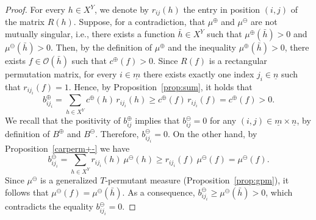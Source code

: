 \documentclass[11pt]{article}
\begin{document}
\begin{proof}
For every $h \in X^{Y}$, we denote by $r_{ij}(h)$ the entry in position $(i,j)$ of the matrix $R(h)$. Suppose, for a contradiction, that $\mu^\oplus$ and $\mu^\ominus$ are not mutually singular, i.e., there exists a function $\bar h \in X^{Y}$ such that $\mu^{\oplus}(\bar h) > 0$ and $\mu^{\ominus}(\bar h) > 0$. Then, by the definition of $\mu^{\oplus}$ and the inequality $\mu^{\oplus}(\bar h) > 0$, there exists $f \in \mathcal{O}(\bar h)$ such that $c^{\oplus}(f) > 0$. Since $R(f)$ is a rectangular permutation matrix, for every $i \in \underline{m}$ there exists exactly one index $j_i \in \underline{n}$ such that $r_{i j_i}(f) = 1$. Hence, by Proposition~\ref{prop:sum}, it holds that
\[
b^{\oplus}_{i j_i}
= \sum_{h \in X^{Y}} c^{\oplus}(h)\, r_{i j_i}(h)
\ge c^{\oplus}(f)\, r_{i j_i}(f)
= c^{\oplus}(f) > 0.
\]
We recall that the positivity of $b^\oplus_{ij}$ implies that $b^\ominus_{ij} = 0$ for any $(i, j)\in \underline{m}\times\underline{n}$, by definition of $B^\oplus$ and $B^\ominus$. Therefore, $b^{\ominus}_{i j_i} = 0$.
On the other hand, by Proposition~\ref{carperm+-} we have
\[
b^{\ominus}_{i j_i}
= \sum_{h \in X^{Y}} r_{i j_i}(h)\ \mu^{\ominus}(h)
\ge r_{i j_i}(f)\ \mu^{\ominus}(f)
= \mu^{\ominus}(f).
\]
Since $\mu^\ominus$ is a generalized $T$-permutant measure (Proposition~\ref{prop:gpm}), it follows that $\mu^{\ominus}(f) = \mu^{\ominus}(\bar h)$. As a consequence, $b^{\ominus}_{i j_i} \ge \mu^{\ominus}(\bar h) > 0$, which contradicts the equality $b^{\ominus}_{i j_i} = 0$.
\end{proof}
\end{document}
